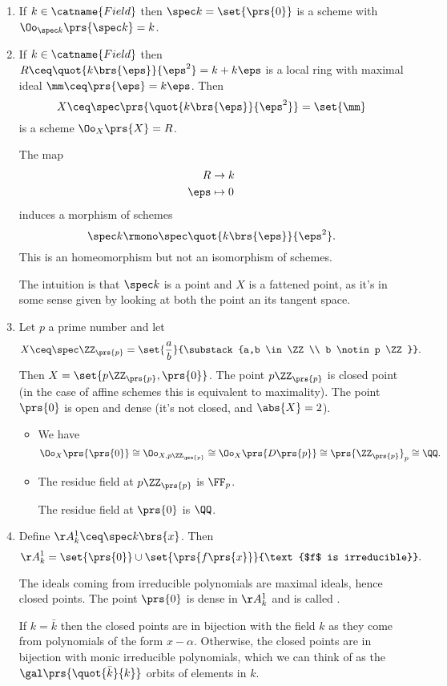 \documentclass[10pt,a4paper,twoside,openany,hidelinks]{book}
\begin{document}
\begin{examples}
\begin{enumerate}
\item
If $k \in \catname{Field}$ then $\spec k = \set{\prs{0}}$ is a scheme
with $\Oo_{\spec k} \prs{\spec k} = k$.
\item If $k \in \catname{Field}$ then
$R \ceq \quot{k\brs{\eps}}{\eps^2} = k + k \eps$ is a local ring with maximal ideal $\mm \ceq \prs{\eps} = k \eps$.
Then 
\[X \ceq \spec \prs{\quot{k\brs{\eps}}{\eps^2}} = \set{\mm}\]
is a scheme $\Oo_X\prs{X} = R$.

The map
\begin{align*}
R &\to k \\
\eps &\mapsto 0
\end{align*}
induces a morphism of schemes
\[\spec k \rmono \spec \quot{k\brs{\eps}}{\eps^2} \text{.}\]
This is an homeomorphism but not an isomorphism of schemes.

The intuition is that $\spec k$ is a point and $X$ is a fattened point, as it's in some sense given by looking at both the point an its tangent space.

\item Let $p$ a prime number and let \[X \ceq \spec \ZZ_{\prs{p}} = \set{\frac{a}{b}}{\substack{a,b \in \ZZ \\ b \notin p \ZZ}}\text{.}\]
Then $X = \set{p \ZZ_{\prs{p}}, \prs{0}}$.
The point $p \ZZ_{\prs{p}}$ is closed point (in the case of affine schemes this is equivalent to maximality).
The point $\prs{0}$ is open and dense (it's not closed, and $\abs{X} = 2$).
\begin{itemize}
\item
We have
\[\Oo_X\prs{\prs{0}} \cong \Oo_{X, p \ZZ_{\prs{p}}} \cong \Oo_X\prs{D\prs{p}} \cong \prs{\ZZ_{\prs{p}}}_p \cong \QQ \text{.}\]
\item
The residue field at $p \ZZ_{\prs{p}}$ is $\FF_p$.

The residue field at $\prs{0}$ is $\QQ$.
\end{itemize}
\item
Define $\AA_k^1 \ceq \spec k\brs{x}$.
Then
\[\AA^1_k = \set{\prs{0}} \cup \set{\prs{f\prs{x}}}{\text{$f$ is irreducible}} \text{.}\]

The ideals coming from irreducible polynomials are maximal ideals, hence closed points.
The point $\prs{0}$ is dense in $\AA_k^1$ and is called .

If $k = \bar{k}$ then the closed points are in bijection with the field $k$ as they come from polynomials of the form $x - \alpha$.
Otherwise, the closed points are in bijection with monic irreducible polynomials, which we can think of as the $\gal\prs{\quot{\bar{k}}{k}}$ orbits of elements in $k$.


\end{enumerate}
\end{examples}
\end{document}
